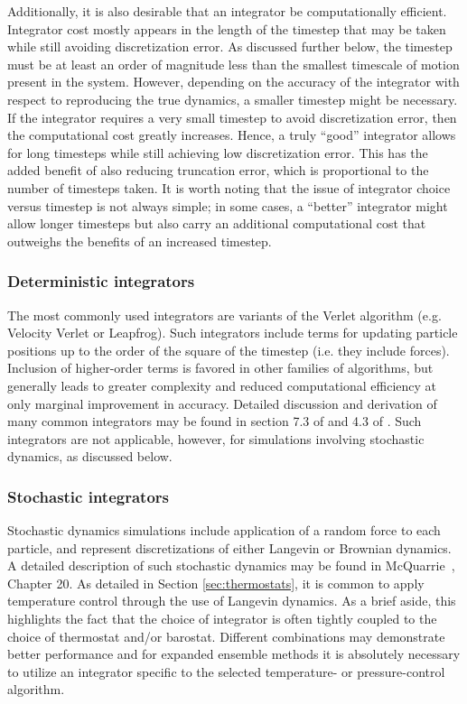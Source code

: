 \documentclass[9pt,bestpractices]{livecoms}
\begin{document}
Additionally, it is also desirable that an integrator be computationally efficient.
Integrator cost mostly appears in the length of the timestep that may be taken while still avoiding discretization error. 
As discussed further below, the timestep must be at least an order of magnitude less than the smallest timescale of motion present in the system.
However, depending on the accuracy of the integrator with respect to reproducing the true dynamics, a smaller timestep might be necessary.
If the integrator requires a very small timestep to avoid discretization error, then the computational cost greatly increases.
Hence, a truly ``good'' integrator allows for long timesteps while still achieving low discretization error.
This has the added benefit of also reducing truncation error, which is proportional to the number of timesteps taken.
It is worth noting that the issue of integrator choice versus timestep is not always simple; in some cases, a ``better'' integrator might allow longer timesteps but also carry an additional computational cost that outweighs the benefits of an increased timestep.

\subsubsection{Deterministic integrators}

The most commonly used integrators are variants of the Verlet algorithm (e.g. Velocity Verlet or Leapfrog).
Such integrators include terms for updating particle positions up to the order of the square of the timestep (i.e. they include forces).
Inclusion of higher-order terms is favored in other families of algorithms, but generally leads to greater complexity and reduced computational efficiency at only marginal improvement in accuracy.
Detailed discussion and derivation of many common integrators may be found in section 7.3 of \citet{LeachBook} and 4.3 of \citet{Frenkel:2001:}.
Such integrators are not applicable, however, for simulations involving stochastic dynamics, as discussed below.

\subsubsection{Stochastic integrators}

Stochastic dynamics simulations include application of a random force to each particle, and represent discretizations of either Langevin or Brownian dynamics.
A detailed description of such stochastic dynamics may be found in McQuarrie~\cite{McQuarrieStatMechBook}, Chapter 20.
As detailed in Section \ref{sec:thermostats}, it is common to apply temperature control through the use of Langevin dynamics.
As a brief aside, this highlights the fact that the choice of integrator is often tightly coupled to the choice of thermostat and/or barostat.
Different combinations may demonstrate better performance and for expanded ensemble methods it is absolutely necessary to utilize an integrator specific to the selected temperature- or pressure-control algorithm.
\end{document}
